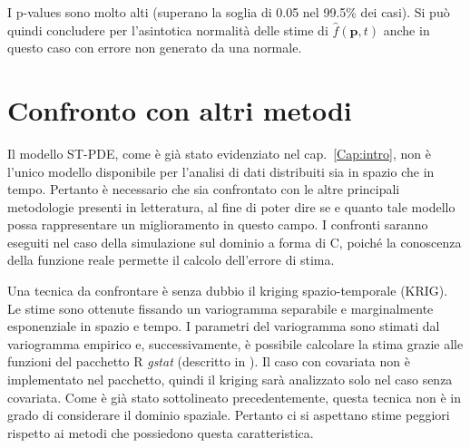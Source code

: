 \documentclass[a4paper,11pt,twoside,openright]{book}							%
\begin{document}
I p-values sono molto alti (superano la soglia di 0.05 nel 99.5\% dei casi). Si può quindi concludere per l'asintotica normalità delle stime di $\hat{f}(\bm p,t)$ anche in questo caso con errore non generato da una normale.
\newpage
\thispagestyle{empty}
\chapter{Confronto con altri metodi}
\label{cap:confronto}

Il modello ST-PDE, come è già stato evidenziato nel cap.~\ref{Cap:intro}, non è l'unico modello disponibile per l'analisi di dati distribuiti sia in spazio che in tempo. Pertanto è necessario che sia confrontato con le altre principali metodologie presenti in letteratura, al fine di poter dire se e quanto tale modello possa rappresentare un miglioramento in questo campo. I confronti saranno eseguiti nel caso della simulazione sul dominio a forma di C, poiché la conoscenza della funzione reale permette il calcolo dell'errore di stima. 

Una tecnica da confrontare è senza dubbio il kriging spazio-temporale (KRIG). Le stime sono ottenute fissando un variogramma separabile e marginalmente esponenziale in spazio e tempo. I parametri del variogramma sono stimati dal variogramma empirico e, successivamente, è possibile calcolare la stima grazie alle funzioni del pacchetto R \textit{gstat} (descritto in \cite{package:gstat}). Il caso con covariata non è implementato nel pacchetto, quindi il kriging sarà analizzato solo nel caso senza covariata. Come è già stato sottolineato precedentemente, questa tecnica non è in grado di considerare il dominio spaziale. Pertanto ci si aspettano stime peggiori rispetto ai metodi che possiedono questa caratteristica.
\end{document}
